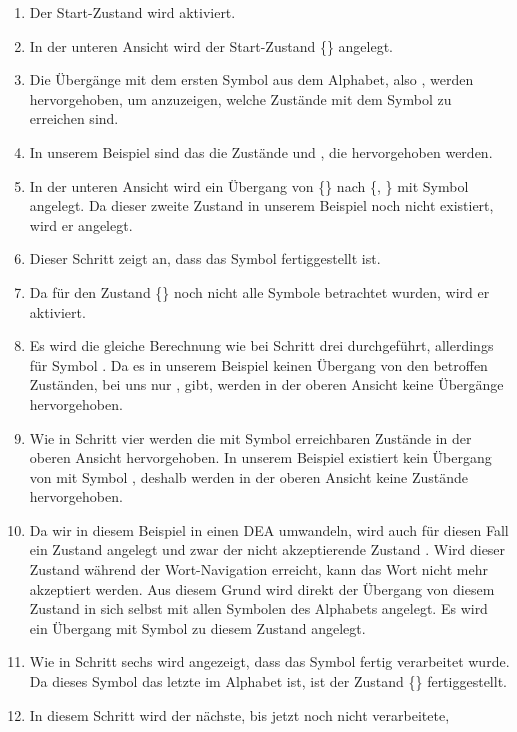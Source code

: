 \begin{enumerate}
  \item Der Start-Zustand  wird aktiviert.
  \item In der unteren Ansicht wird der Start-Zustand \{\} angelegt.
  \item Die Übergänge mit dem ersten Symbol aus dem Alphabet, also ,
  werden hervorgehoben, um anzuzeigen, welche Zustände mit dem Symbol zu
  erreichen sind.
  \item In unserem Beispiel sind das die Zustände  und ,
  die hervorgehoben werden.
  \item In der unteren Ansicht wird ein Übergang von \{\} nach
  \{, \} mit Symbol  angelegt. Da dieser zweite
  Zustand in unserem Beispiel noch nicht existiert, wird er angelegt.
  \item Dieser Schritt zeigt an, dass das Symbol  fertiggestellt ist.
  \item Da für den Zustand \{\} noch nicht alle Symbole betrachtet
  wurden, wird er aktiviert.
  \item Es wird die gleiche Berechnung wie bei Schritt drei durchgeführt,
  allerdings für Symbol . Da es in unserem Beispiel keinen Übergang
  von den betroffen Zuständen, bei uns nur , gibt, werden in der
  oberen Ansicht keine Übergänge hervorgehoben.
  \item Wie in Schritt vier werden die mit Symbol  erreichbaren
  Zustände in der oberen Ansicht hervorgehoben. In unserem Beispiel existiert
  kein Übergang von  mit Symbol , deshalb werden in der
  oberen Ansicht keine Zustände hervorgehoben.
  \item Da wir in diesem Beispiel in einen DEA umwandeln, wird auch für diesen
  Fall ein Zustand angelegt und zwar der nicht akzeptierende Zustand
  \State{$\emptyset$}. Wird dieser Zustand während der Wort-Navigation
  erreicht, kann das Wort nicht mehr akzeptiert werden. Aus diesem Grund wird
  direkt der Übergang von diesem Zustand in sich selbst mit allen Symbolen des
  Alphabets angelegt. Es wird ein Übergang mit Symbol  zu diesem
  Zustand \State{$\emptyset$} angelegt.
  \item Wie in Schritt sechs wird angezeigt, dass das Symbol  fertig
  verarbeitet wurde. Da dieses Symbol das letzte im Alphabet ist, ist der
  Zustand \{\} fertiggestellt.
  \item In diesem Schritt wird der nächste, bis jetzt noch nicht verarbeitete,

\end{enumerate}
